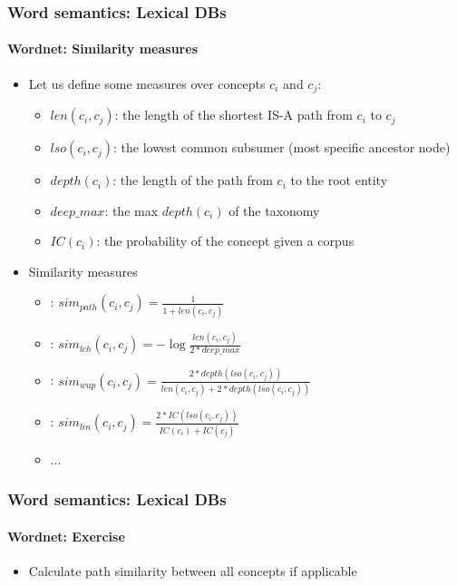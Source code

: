 \documentclass[xcolor=table]{beamer}
\begin{document}
\begin{frame}
	\frametitle{Word semantics: Lexical DBs}
	\framesubtitle{Wordnet: Similarity measures}
	
	\begin{itemize}
		\item Let us define some measures over concepts $c_i$ and $c_j$:
		\begin{itemize}
			\item $len(c_i, c_j)$: the length of the shortest IS-A path from $c_i$ to $c_j$
			\item $lso(c_i, c_j)$: the lowest common subsumer (most specific ancestor node)
			\item $depth(c_i)$: the length of the path from $c_i$ to the root entity
			\item $deep\_max$: the max $depth(c_i)$ of the taxonomy
			\item $IC(c_i)$: the probability of the concept given a corpus
		\end{itemize}
		\item Similarity measures
		\begin{itemize}
			\item {}: $sim_{path}(c_i, c_j) = \frac{1}{1+len(c_i, c_j)}$
			\item {}: $sim_{lch}(c_i, c_j) = -\log\frac{len(c_i, c_j)}{2*deep\_max}$
			\item {}: $sim_{wup}(c_i, c_j) = \frac{2*depth(lso(c_i, c_j))}{len(c_i, c_j)+2*depth(lso(c_i, c_j))}$
			\item {}: $sim_{lin}(c_i, c_j) = \frac{2*IC(lso(c_i, c_j))}{IC(c_i)+IC(c_j)}$ 
			\item ...
		\end{itemize}
	\end{itemize}
	
\end{frame}

\begin{frame}
	\frametitle{Word semantics: Lexical DBs}
	\framesubtitle{Wordnet: Exercise}
	
	
	\begin{itemize}
		\item Calculate path similarity between all concepts if applicable
	\end{itemize}
	
\end{frame}
\end{document}
